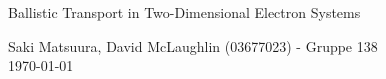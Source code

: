 \documentclass[11pt, a4paper]{article}
\begin{document}
\begin{center}

        {\huge Ballistic Transport in Two-Dimensional Electron Systems}
    \vspace{0.1cm}

      	{Saki Matsuura, David McLaughlin (03677023) - Gruppe 138} \\
      	{\today}
    \vspace{-0.2cm}

\end{center}




\end{document}
